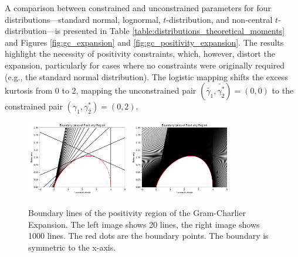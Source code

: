 A comparison between constrained and unconstrained parameters for four distributions—standard normal, lognormal, $t$-distribution, and non-central $t$-distribution—is presented in Table \ref{table:distributions_theoretical_moments} and Figures \ref{fig:gc_expansion} and \ref{fig:gc_positivity_expansion}. The results highlight the necessity of positivity constraints, which, however, distort the expansion, particularly for cases where no constraints were originally required (e.g., the standard normal distribution). The logistic mapping shifts the excess kurtosis from 0 to 2, mapping the unconstrained pair $(\tilde{\gamma_1}, \tilde{\gamma_2^*}) = (0,0)$ to the constrained pair $(\gamma_1, \gamma_2^*) = (0,2)$.

\begin{figure}[h]
    \centering
    \includegraphics[width=0.4\textwidth]{img/gc_positivity_boundary_lines_20.png}
    \includegraphics[width=0.4\textwidth]{img/gc_positivity_boundary_lines_1000.png}
    \caption{Boundary lines of the positivity region of the Gram-Charlier Expansion. The left image shows 20 lines, the right image shows 1000 lines. The red dots are the boundary points. The boundary is symmetric to the x-axis.}
    \label{fig:gram_charlier_boundary_lines_20_vs_1000}
\end{figure}

